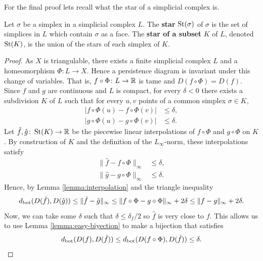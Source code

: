 For the final proof lets recall what the star of a simplicial complex is.

\begin{definition}
    Let $\sigma $ be a simplex in a simplicial complex $ L $. The {\bf star} $ \operatorname{St}(\sigma) $ of $ \sigma $ is the set of simplices in $ L $ which contain $ \sigma $ as a face. The {\bf star of a subset} $ K $ of $ L $, denoted $ \operatorname{St}(K) $, is the union of the stars of each simplex of $ K $.
\end{definition}

\Main*
\begin{proof}
    As $ X $ is triangulable, there exists a finite simplicial complex $ L $ and a homeomorphism $ \Phi\colon L \to X $. Hence a persistence diagram is invariant under this change of variables. That is, $ f \circ \Phi\colon L \to \mathbb R $ is tame and $ D(f \circ \Phi) = D(f) $. Since $ f $ and $ g $ are continuous and $ L $ is compact, for every $ \delta < 0 $ there exists a subdivision $ K $ of $ L $ such that for every $ u, v $ points of a common simplex $ \sigma \in K $, 
    \begin{align}
        |f \circ \Phi (u) - f \circ \Phi(v)| &\leq \delta, \\
        |g \circ \Phi (u) - g \circ \Phi(v)| &\leq \delta.
    \end{align}
    Let $ \hat f, \hat g \colon \operatorname{St}(K) \to \mathbb R $ be the piecewise linear interpolations of $ f \circ \Phi $ and $ g \circ \Phi $ on $ K $. By construction of $ K $ and the definition of the $ L_\infty$-norm, these interpolations satisfy
    \begin{align}
        \| \hat f - f \circ \Phi \|_\infty &\leq \delta, \\
        \| \hat g - g \circ \Phi \|_\infty &\leq \delta.
    \end{align}
    Hence, by Lemma \ref{lemma:interpolation} and the triangle inequality
    \begin{equation}
        d_{\operatorname{bot}}(D(\hat f), D(\hat g)) \leq \|\hat f - \hat g \|_\infty \leq \| f \circ \Phi - g \circ \Phi \|_\infty + 2 \delta \leq \| f - g \|_\infty + 2 \delta.
    \end{equation}
    Now, we can take some $ \delta $ such that $ \delta \leq \delta_f/2 $ so $ \hat f $ is very close to $ f $. This allows us to use Lemma \ref{lemma:easy-biyection} to make a bijection that satisfies
    \begin{equation}
        \db(D(f), D(\hat f)) \leq \db(D(f \circ \Phi), D(\hat f)) \leq \delta.

\end{equation}
\end{proof}
